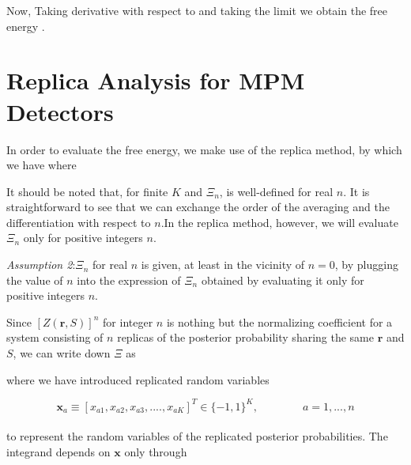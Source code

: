 \documentclass[letterpaper,english,10pt]{article}
\begin{document}
Now,
Taking derivative with respect to and taking the limit we obtain the free energy .

\section{Replica Analysis for MPM Detectors}
In order to evaluate the free energy, we make use of the replica
method, by which we have
where


It should be noted that, for finite $K$ and $\Xi_n$, is well-defined for real $n$. It is straightforward to see that we can exchange the order of the averaging and the differentiation with respect to $n$.In the replica method, however, we will evaluate $\Xi_n$ only for positive integers $n$.

\textit{Assumption 2}:$\Xi_n$ for real $n$ is given, at least in the vicinity of $n = 0$, by plugging the value of $n$ into the expression of $\Xi_n$ obtained by evaluating it only for positive integers $n$.

Since $[Z(\textbf{r},S)]^n$ for integer $n$ is nothing but the normalizing coefficient for a system consisting of $n$ replicas of the posterior probability sharing the same $\textbf{r}$ and $S$, we can write down $\Xi$ as


where we have introduced replicated random variables 

$$\textbf{x}_a \equiv[x_{a1}, x_{a2}, x_{a3}, .... , x_{aK}]^T \in \{-1,1\}^K, \qquad \qquad a=1,...,n$$\\
to represent the random variables of the replicated posterior probabilities. The integrand depends on $\textbf{x}$ only through

\end{document}
